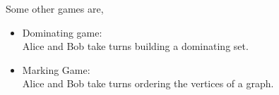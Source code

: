 \documentclass{beamer}
\begin{document}
\begin{frame}{\secname}
    
    Some other games are,
    \begin{itemize}
        \item Dominating game: \\
        Alice and Bob take turns building a dominating set.
        \pause
        \item Marking Game: \\
        Alice and Bob take turns ordering the vertices of a graph.
    \end{itemize}
    
\end{frame}
\end{document}
